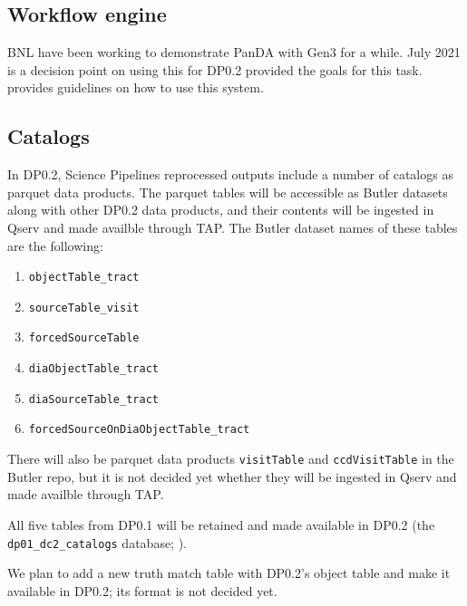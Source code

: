 \subsection {Workflow engine}
BNL have been working to demonstrate PanDA with Gen3 for a while. July 2021 is a decision point on using this for DP0.2
 provided the goals for this task.  provides guidelines on how to use this system.


\subsection {Catalogs}
In DP0.2, Science Pipelines reprocessed outputs include a number of catalogs
as parquet data products.
The parquet tables will be accessible as Butler datasets along with other DP0.2 data products, and their contents will be ingested in Qserv and made availble through TAP.
The Butler dataset names of these tables are the following:
\begin{enumerate}
  \item \texttt{objectTable\_tract}
  \item \texttt{sourceTable\_visit}
  \item \texttt{forcedSourceTable}
  \item \texttt{diaObjectTable\_tract}
  \item \texttt{diaSourceTable\_tract}
  \item \texttt{forcedSourceOnDiaObjectTable\_tract}
\end{enumerate}

There will also be parquet data products \texttt{visitTable} and \texttt{ccdVisitTable} in the Butler repo, but it is not decided yet whether they will be ingested in Qserv and made availble through TAP.

All five tables from DP0.1 will be retained and made available in DP0.2
(the \texttt{dp01\_dc2\_catalogs} database; ).

We plan to add a new truth match table with DP0.2's object table and make it available in DP0.2; its format is not decided yet.
